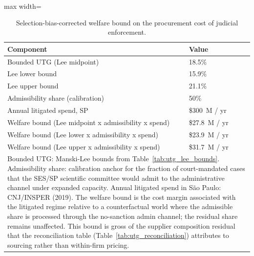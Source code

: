 \begin{table}

\caption{\label{tab:welfare_bound}Selection-bias-corrected welfare bound on the procurement cost of judicial enforcement.}
\centering
\begin{adjustbox}{max width=\textwidth}
\begin{tabular}[t]{ll}
\toprule
Component & Value\\
\midrule
Bounded UTG (Lee midpoint) & 18.5\%\\
Lee lower bound & 15.9\%\\
Lee upper bound & 21.1\%\\
Admissibility share (calibration) & 50\%\\
Annual litigated spend, SP & \$300~M / yr\\
\addlinespace
Welfare bound (Lee midpoint x admissibility x spend) & \$27.8~M / yr\\
Welfare bound (Lee lower x admissibility x spend) & \$23.9~M / yr\\
Welfare bound (Lee upper x admissibility x spend) & \$31.7~M / yr\\
\bottomrule
\multicolumn{2}{l}{\rule{0pt}{1em}Bounded UTG: Manski-Lee bounds from Table~\ref{tab:utg_lee_bounds}. Admissibility share: calibration anchor for the fraction of court-mandated cases that the SES/SP scientific committee would admit to the administrative channel under expanded capacity. Annual litigated spend in S\~ao Paulo: CNJ/INSPER (2019). The welfare bound is the cost margin associated with the litigated regime relative to a counterfactual world where the admissible share is processed through the no-sanction admin channel; the residual share remains unaffected. This bound is gross of the supplier composition residual that the reconciliation table (Table~\ref{tab:utg_reconciliation}) attributes to sourcing rather than within-firm pricing.}\\
\end{tabular}
\end{adjustbox}
\end{table}
